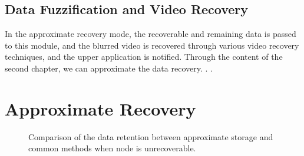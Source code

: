 \documentclass[sigconf]{acmart}
\begin{document}
\subsection{Data Fuzzification and Video Recovery}
In the approximate recovery mode, the recoverable and remaining data is passed to this module, and the blurred video is recovered through various video recovery techniques, and the upper application is notified. Through the content of the second chapter, we can approximate the data recovery. . .

\section{Approximate Recovery}\label{ap-recovery}

\begin{figure}
\caption{Comparison of the data retention  between approximate storage and common methods when node is unrecoverable.}
\end{figure}
\end{document}

